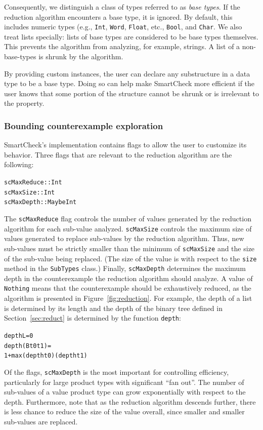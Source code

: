\documentclass[10pt]{sigplanconf}
\newenvironment{code}{\begin{alltt}}{\end{alltt}}
\newcommand{\ttp}[1]{\texttt{#1}}
\begin{document}
Consequently, we distinguish a class of types referred to as \emph{base types}.
If the reduction algorithm encounters a base type, it is ignored.  By default,
this includes numeric types (e.g., \ttp{Int}, \ttp{Word}, \ttp{Float}, etc.,
\ttp{Bool}, and \ttp{Char}.  We also treat lists specially: lists of base types
are considered to be base types themselves.  This prevents the algorithm from
analyzing, for example, strings.  A list of a non-base-types is shrunk by the
algorithm.

By providing custom instances, the user can declare any substructure in a data
type to be a base type.  Doing so can help make SmartCheck more efficient if the
user knows that some portion of the structure cannot be shrunk or is irrelevant
to the property.

\subsubsection{Bounding counterexample exploration}

SmartCheck's implementation contains flags to allow the user to customize its
behavior.  Three flags that are relevant to the reduction algorithm are the
following:
%
\begin{code}
scMaxReduce :: Int
scMaxSize   :: Int
scMaxDepth  :: Maybe Int
\end{code}
%
\noindent
The \ttp{scMaxReduce} flag controls the number of values generated by the
reduction algorithm for each sub-value analyzed.  \ttp{scMaxSize} controls the
maximum size of values generated to replace sub-values by the reduction
algorithm.  Thus, new sub-values must be strictly smaller than the minimum of
\ttp{scMaxSize} and the size of the sub-value being replaced.  (The size of the
value is with respect to the \ttp{size} method in the \ttp{SubTypes} class.)
Finally, \ttp{scMaxDepth} determines the maximum depth in the counterexample the
reduction algorithm should analyze.  A value of \ttp{Nothing} means that the
counterexample should be exhaustively reduced, as the algorithm is presented in
Figure~\ref{fig:reduction}.  For example, the depth of a list is determined by
its length and the depth of the binary tree defined in Section~\ref{sec:reduct}
is determined by the function \ttp{depth}:
%
\begin{code}
depth L         = 0
depth (B t0 t1) =
  1 + max (depth t0) (depth t1)
\end{code}
%
\noindent
Of the flags, \ttp{scMaxDepth} is the most important for controlling
efficiency, particularly for large product types with significant ``fan out''.
The number of sub-values of a value product type can grow exponentially with
respect to the depth.  Furthermore, note that as the reduction algorithm
descends further, there is less chance to reduce the size of the value overall,
since smaller and smaller sub-values are replaced.
\end{document}
